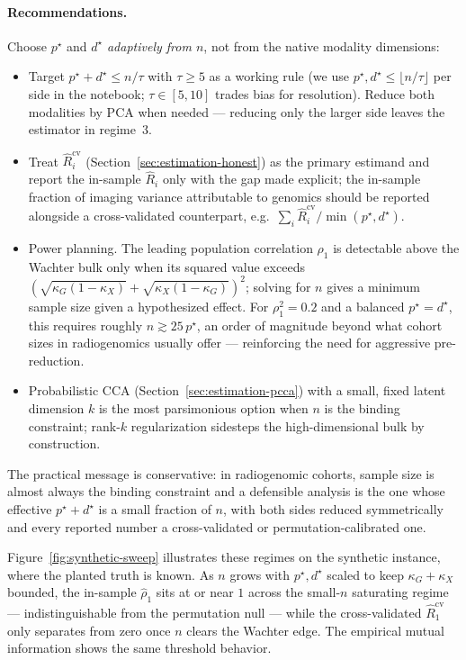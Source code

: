 \documentclass{article}
\begin{document}
\paragraph{Recommendations.} Choose $p^\star$ and $d^\star$ \emph{adaptively
from $n$}, not from the native modality dimensions:
\begin{itemize}
\item Target $p^\star + d^\star \le n/\tau$ with $\tau \ge 5$ as a working
rule (we use $p^\star, d^\star \le \lfloor n/\tau \rfloor$ per side in the
notebook; $\tau \in [5,10]$ trades bias for resolution). Reduce both
modalities by PCA when needed --- reducing only the larger side leaves the
estimator in regime~3.
\item Treat $\hat R_i^{\mathrm{cv}}$ (Section~\ref{sec:estimation-honest}) as
the primary estimand and report the in-sample $\hat R_i$ only with the gap
made explicit; the in-sample fraction of imaging variance attributable to
genomics should be reported alongside a cross-validated counterpart, e.g.\
$\sum_i \hat R_i^{\mathrm{cv}}/\min(p^\star, d^\star)$.
\item Power planning. The leading population correlation $\rho_1$ is detectable
above the Wachter bulk only when its squared value exceeds
$(\sqrt{\kappa_G(1-\kappa_X)} + \sqrt{\kappa_X(1-\kappa_G)})^2$; solving for $n$
gives a minimum sample size given a hypothesized effect. For
$\rho_1^2 = 0.2$ and a balanced $p^\star = d^\star$, this requires roughly
$n \gtrsim 25\,p^\star$, an order of magnitude beyond what cohort sizes in
radiogenomics usually offer --- reinforcing the need for aggressive
pre-reduction.
\item Probabilistic CCA (Section~\ref{sec:estimation-pcca}) with a small,
fixed latent dimension $k$ is the most parsimonious option when $n$ is the
binding constraint; rank-$k$ regularization sidesteps the high-dimensional
bulk by construction.
\end{itemize}

The practical message is conservative: in radiogenomic cohorts, sample size
is almost always the binding constraint and a defensible analysis is the one
whose effective $p^\star + d^\star$ is a small fraction of $n$, with both
sides reduced symmetrically and every reported number a cross-validated or
permutation-calibrated one.

Figure~\ref{fig:synthetic-sweep} illustrates these regimes on the synthetic
instance, where the planted truth is known. As $n$ grows with $p^\star, d^\star$
scaled to keep $\kappa_G + \kappa_X$ bounded, the in-sample $\hat\rho_1$ sits at
or near $1$ across the small-$n$ saturating regime --- indistinguishable from
the permutation null --- while the cross-validated $\hat R_1^{\mathrm{cv}}$ only
separates from zero once $n$ clears the Wachter edge. The empirical mutual
information shows the same threshold behavior.
\end{document}
